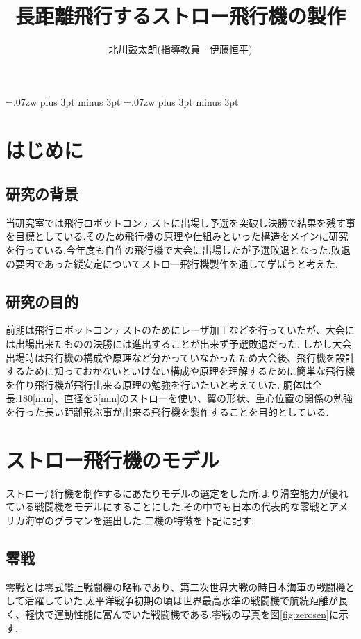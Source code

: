 \documentclass[twocolumn,11pt]{abst}
\title{長距離飛行するストロー飛行機の製作}
\author{北川鼓太朗(指導教員　伊藤恒平)}
\begin{document}
\maketitle
\thispagestyle{fancy}
\pagestyle{fancy}

\setlength{\baselineskip}{5.6truemm}
\kanjiskip=.07zw plus 3pt minus 3pt
\xkanjiskip=.07zw plus 3pt minus 3pt



\section{はじめに}
\subsection{研究の背景}
当研究室では飛行ロボットコンテストに出場し予選を突破し決勝で結果を残す事を目標としている.そのため飛行機の原理や仕組みといった構造をメインに研究を行っている.今年度も自作の飛行機で大会に出場したが予選敗退となった.敗退の要因であった縦安定についてストロー飛行機製作を通して学ぼうと考えた.

\subsection{研究の目的}
前期は飛行ロボットコンテストのためにレーザ加工などを行っていたが、大会には出場出来たものの決勝には進出することが出来ず予選敗退だった.
しかし大会出場時は飛行機の構成や原理など分かっていなかったため大会後、飛行機を設計するために知っておかないといけない構成や原理を理解するために簡単な飛行機を作り飛行機が飛行出来る原理の勉強を行いたいと考えていた.
胴体は全長:180[mm]、直径を5[mm]のストローを使い、翼の形状、重心位置の関係の勉強を行った長い距離飛ぶ事が出来る飛行機を製作することを目的としている.

\section{ストロー飛行機のモデル}
ストロー飛行機を制作するにあたりモデルの選定をした所,より滑空能力が優れている戦闘機をモデルにすることにした.その中でも日本の代表的な零戦とアメリカ海軍のグラマンを選出した.二機の特徴を下記に記す.

\subsection{零戦}
零戦とは零式艦上戦闘機の略称であり、第二次世界大戦の時日本海軍の戦闘機として活躍していた.太平洋戦争初期の頃は世界最高水準の戦闘機で航続距離が長く、軽快で運動性能に富んでいた戦闘機である.零戦の写真を図\ref{fig:zerosen}に示す.
\end{document}
